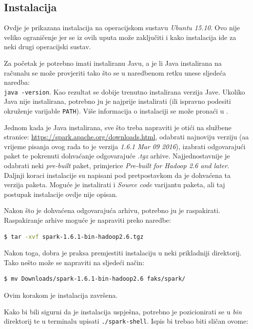 \documentclass[times, utf8, zavrsni, numeric]{fer}
\begin{document}
\newpage
\begin{appendices}
\chapter{Instalacija}
\label{ch:instalacijaSpark}
Ovdje je prikazana instalacija na operacijskom sustavu \emph{Ubuntu 15.10}. Ovo nije veliko ograničenje jer se iz ovih uputa može zaključiti i kako instalacija ide za neki drugi operacijski sustav.

Za početak je potrebno imati instaliranu Javu, a je li Java instalirana na računalu se može provjeriti tako što se u naredbenom retku unese sljedeća naredba:\\
\texttt{java -version}. Kao rezultat se dobije trenutno instalirana verzija Jave. Ukoliko Java nije instalirana, potrebno ju je najprije instalirati (ili ispravno podesiti okruženje varijable \texttt{PATH}). Više informacija o instalaciji se može pronaći u \cite{marcupic}.

Jednom kada je Java instalirana, sve što treba napraviti je otići na službene stranice: \url{https://spark.apache.org/downloads.html}, odabrati najnoviju verziju (aa vrijeme pisanja ovog rada to je verzija \emph{1.6.1 Mar 09 2016}), izabrati odgovarajući paket te pokrenuti dohvaćanje odgovarajuće \emph{.tgz} arhive. Najjednostavnije je odabrati neki \emph{pre-built} paket, primjerice \emph{Pre-built for Hadoop 2.6 and later}. Daljnji koraci instalacije su napisani pod pretpostavkom da je dohvaćena ta verzija paketa. Moguće je instalirati i \emph{Source code} varijantu paketa, ali taj postupak instalacije ovdje nije opisan. 

Nakon što je dohvaćena odgovarajuća arhivu, potrebno ju je raspakirati.\\ Raspakiranje arhive moguće je napraviti preko naredbe:
\begin{lstlisting}[language=bash]
$ tar -xvf spark-1.6.1-bin-hadoop2.6.tgz
\end{lstlisting}
Nakon toga, dobra je praksa premjestiti instalaciju u neki prikladniji direktorij. Tako nešto može se napraviti na sljedeći način:
\begin{lstlisting}[language=bash]
$ mv Downloads/spark-1.6.1-bin-hadoop2.6 faks/spark/
\end{lstlisting}
Ovim korakom je instalacija završena. 

Kako bi bili sigurni da je instalacija uspješna, potrebno je pozicionirati se u \emph{bin} direktorij te u terminalu upisati \texttt{./spark-shell}. Ispis bi trebao biti sličan ovome:


\end{appendices}
\end{document}
